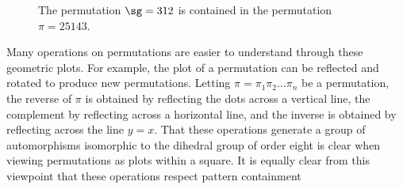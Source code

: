 \documentclass[12pt,twoside]{memoir}
\begin{document}
      \begin{figure}[t]
        \centering
          \hspace{1pc}
          \raisebox{2pc}{$\subset$}
          \hspace{1pc}
          \hspace{1pc}
          \raisebox{2pc}{$= $}
          \hspace{1pc}

        \caption{The permutation $\sg = 312$ is contained in the permutation $\pi =
                  25143$. }
        \label{prelim:fig:plotpattern}
      \end{figure}

      
      Many operations on permutations are easier to understand
      through these geometric plots. For example, the plot of a permutation can
      be reflected and rotated to produce new permutations. Letting $\pi = \pi_1
      \pi_2 \dots \pi_n$ be a permutation, the reverse of $\pi$ is obtained by
      reflecting the dots across a vertical line, the complement by reflecting
      across a horizontal line, and the inverse is obtained by reflecting across
      the line $y = x$. That these operations generate a group of automorphisms
      isomorphic to the dihedral group of order eight is clear when
      viewing permutations as plots within a square. It is equally clear from
      this viewpoint that these operations respect pattern containment
      
\end{document}

